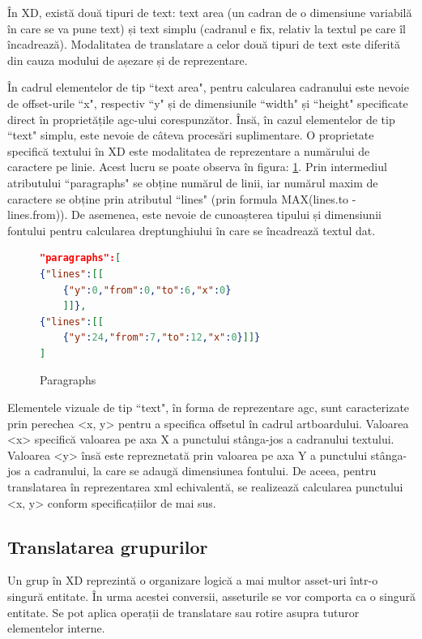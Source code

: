 În XD, există două tipuri de text: text area (un cadran de o dimensiune variabilă în care se va pune text) și text simplu (cadranul e fix, relativ la textul pe care îl încadrează). Modalitatea de translatare a celor două tipuri de text este diferită din cauza modului de așezare și de reprezentare. 

În cadrul elementelor de tip ``text area", pentru calcularea cadranului este nevoie de offset-urile ``x", respectiv ``y" și de dimensiunile ``width" și ``height" specificate direct în proprietățile agc-ului corespunzător. Însă, în cazul elementelor de tip ``text" simplu, este nevoie de câteva procesări suplimentare.
O proprietate specifică textului în XD este modalitatea de reprezentare a numărului de caractere pe linie. Acest lucru se poate observa în figura: \ref{fig:Paragraphs}. Prin intermediul atributului ``paragraphs" se obține numărul de linii, iar numărul maxim de caractere se obține prin atributul ``lines" (prin formula  MAX(lines.to - lines.from)). De asemenea, este nevoie de cunoașterea tipului și dimensiunii fontului pentru calcularea dreptunghiului în care se încadrează textul dat.

\begin{figure}[!htbp]
\begin{lstlisting}[language=json,firstnumber=1]
"paragraphs":[
{"lines":[[
    {"y":0,"from":0,"to":6,"x":0}
    ]]},
{"lines":[[
    {"y":24,"from":7,"to":12,"x":0}]]}
]
\end{lstlisting}
\caption{Paragraphs} \label{fig:Paragraphs}
\end{figure}

Elementele vizuale de tip ``text", în forma de reprezentare agc, sunt caracterizate prin perechea <x, y> pentru a specifica offsetul în cadrul artboardului. Valoarea <x> specifică valoarea pe axa X a punctului stânga-jos a cadranului textului. Valoarea <y> însă este repreznetată prin valoarea pe axa Y a punctului stânga-jos a cadranului, la care se adaugă dimensiunea fontului. De aceea, pentru translatarea în reprezentarea xml echivalentă, se realizează calcularea punctului <x, y> conform specificațiilor de mai sus.

\subsection{Translatarea grupurilor}

Un grup în XD reprezintă o organizare logică a mai multor asset-uri într-o singură entitate. În urma acestei conversii, asseturile se vor comporta ca o singură entitate. Se pot aplica operații de translatare sau rotire asupra tuturor elementelor interne. 

